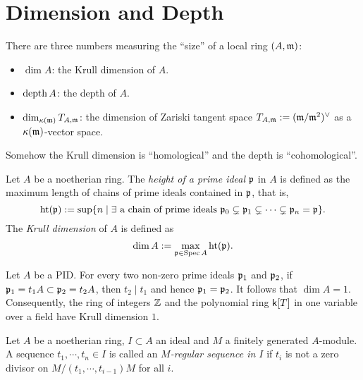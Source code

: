 \section{Dimension and Depth}

There are three numbers measuring the ``size'' of a local ring $(A,{\mathfrak{m}})$:
    \begin{itemize}
        \item $\dim A$: the Krull dimension of $A$.
        \item $\operatorname{depth} A$: the depth of $A$.
        \item $\dim_{{\kappa}({\mathfrak{m}})} T_{A,{\mathfrak{m}}}$: the dimension of Zariski tangent space $T_{A,{\mathfrak{m}}} := ({\mathfrak{m}}/{\mathfrak{m}}^2)^\lor$ as a ${{\kappa}({\mathfrak{m}})}$-vector space.
    \end{itemize}

Somehow the Krull dimension is ``homological'' and the depth is ``cohomological''.

\begin{definition}\label{def: height of ideals and Krull dimension}
    Let $A$ be a noetherian ring.
    The \textit{height of a prime ideal} ${\mathfrak{p}}$ in $A$ is defined as the maximum length of chains of prime ideals contained in ${\mathfrak{p}}$, that is, 
    \[ \operatorname{ht}({\mathfrak{p}}) := \sup\{ n \mid \exists \text{ a chain of prime ideals } {\mathfrak{p}}_0 \subsetneq {\mathfrak{p}}_1 \subsetneq \cdots \subsetneq {\mathfrak{p}}_n = {\mathfrak{p}}\}. \] 
    The \textit{Krull dimension} of $A$ is defined as 
    \[ \dim A := \max_{{\mathfrak{p}} \in \operatorname{Spec} A}\operatorname{ht}({\mathfrak{p}}). \]
\end{definition}

\begin{example}
    Let \(A\) be a PID.
    For every two non-zero prime ideals \({\mathfrak{p}}_1\) and \({\mathfrak{p}}_2\), 
    if \({\mathfrak{p}}_1 = t_1A \subset {\mathfrak{p}}_2 = t_2A\), then \(t_2 \mid t_1\) and hence \({\mathfrak{p}}_1 = {\mathfrak{p}}_2\).
    It follows that \(\dim A = 1\).
    Consequently, the ring of integers \({\mathbb{Z}}\) and the polynomial ring \({\mathsf{k}}[T]\) in one variable over a field have Krull dimension \(1\).
\end{example}

\begin{definition}\label{def: regular sequence}
    Let $A$ be a noetherian ring, $I \subset A$ an ideal and $M$ a finitely generated $A$-module.
    A sequence $t_1,\cdots,t_n\in I$ is called an \textit{$M$-regular sequence in $I$} if $t_i$ is not a zero divisor on $M/(t_1,\cdots,t_{i-1})M$ for all $i$. 
\end{definition}

